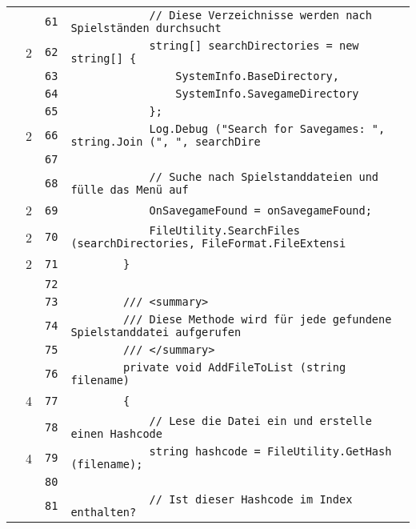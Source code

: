 \documentclass[a4paper,10pt]{article}
\begin{document}
\begin{longtable}[l]{lrrl}
\cellcolor{gray} &  & \verb~61~ & \verb~            // Diese Verzeichnisse werden nach Spielständen durchsucht~\\
\cellcolor{green} & 2 & \verb~62~ & \verb~            string[] searchDirectories = new string[] {~\\
\cellcolor{gray} &  & \verb~63~ & \verb~                SystemInfo.BaseDirectory,~\\
\cellcolor{gray} &  & \verb~64~ & \verb~                SystemInfo.SavegameDirectory~\\
\cellcolor{gray} &  & \verb~65~ & \verb~            };~\\
\cellcolor{green} & 2 & \verb~66~ & \verb~            Log.Debug ("Search for Savegames: ", string.Join (", ", searchDire~\\
\cellcolor{gray} &  & \verb~67~ & \verb~~\\
\cellcolor{gray} &  & \verb~68~ & \verb~            // Suche nach Spielstanddateien und fülle das Menü auf~\\
\cellcolor{green} & 2 & \verb~69~ & \verb~            OnSavegameFound = onSavegameFound;~\\
\cellcolor{green} & 2 & \verb~70~ & \verb~            FileUtility.SearchFiles (searchDirectories, FileFormat.FileExtensi~\\
\cellcolor{green} & 2 & \verb~71~ & \verb~        }~\\
\cellcolor{gray} &  & \verb~72~ & \verb~~\\
\cellcolor{gray} &  & \verb~73~ & \verb~        /// <summary>~\\
\cellcolor{gray} &  & \verb~74~ & \verb~        /// Diese Methode wird für jede gefundene Spielstanddatei aufgerufen~\\
\cellcolor{gray} &  & \verb~75~ & \verb~        /// </summary>~\\
\cellcolor{gray} &  & \verb~76~ & \verb~        private void AddFileToList (string filename)~\\
\cellcolor{green} & 4 & \verb~77~ & \verb~        {~\\
\cellcolor{gray} &  & \verb~78~ & \verb~            // Lese die Datei ein und erstelle einen Hashcode~\\
\cellcolor{green} & 4 & \verb~79~ & \verb~            string hashcode = FileUtility.GetHash (filename);~\\
\cellcolor{gray} &  & \verb~80~ & \verb~~\\
\cellcolor{gray} &  & \verb~81~ & \verb~            // Ist dieser Hashcode im Index enthalten?~\\

\end{longtable}
\end{document}
